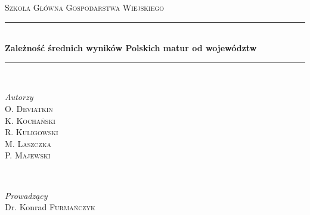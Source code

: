 \documentclass[11pt]{article}
\begin{document}

\begin{titlepage} 


	
	\newcommand{\HRule}{\rule{\linewidth}{0.5mm}} 
	
	\center
	
	

	
	\textsc{\LARGE Szkoła Główna Gospodarstwa Wiejskiego}\\[2cm] 
	
	
	\HRule\\[0.4cm]
	
	{\huge\bfseries Zależność średnich wyników Polskich matur od województw}\\[0.4cm] 
	
	\HRule\\[1.5cm]
	
	
	\begin{minipage}{0.4\textwidth}
		\begin{flushleft}
			\large
			\textit{Autorzy}\\
			O. \textsc{Deviatkin} \\
			K. \textsc{Kochański} \\
			R. \textsc{Kuligowski} \\
			M. \textsc{Laszczka} \\
			P. \textsc{Majewski} \\
		\end{flushleft}
	\end{minipage}
	~
	\begin{minipage}{0.4\textwidth}
		\begin{flushright}
			\large
			\textit{Prowadzący}\\
			Dr. Konrad \textsc{Furmańczyk} 
		\end{flushright}
	\end{minipage}
	
	

\end{titlepage}
\end{document}
